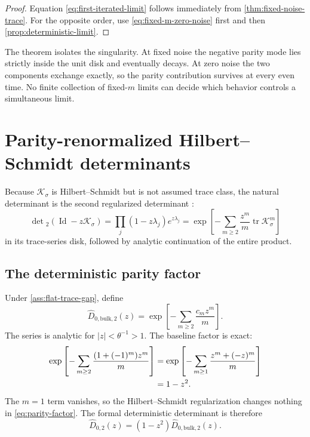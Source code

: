 \documentclass[11pt]{article}
\theoremstyle{definition}
\theoremstyle{remark}
\newcommand{\cK}{\mathcal K}
\newcommand{\Id}{\operatorname{Id}}
\newcommand{\tr}{\operatorname{tr}}
\newcommand{\Det}{\operatorname{det}}
\begin{document}
\begin{proof}
Equation \eqref{eq:first-iterated-limit} follows immediately from
\cref{thm:fixed-noise-trace}.  For the opposite order, use
\eqref{eq:fixed-m-zero-noise} first and then
\cref{prop:deterministic-limit}.
\end{proof}

The theorem isolates the singularity.  At fixed noise the negative parity
mode lies strictly inside the unit disk and eventually decays.  At zero noise
the two components exchange exactly, so the parity contribution survives at
every even time.  No finite collection of fixed-$m$ limits can decide which
behavior controls a simultaneous limit.

\section{Parity-renormalized Hilbert--Schmidt determinants}
\label{sec:determinants}

Because $\cK_\sigma$ is Hilbert--Schmidt but is not assumed trace class, the
natural determinant is the second regularized determinant
\citep{Simon2005}:
\begin{equation}\label{eq:det2}
 \Det{}_2(\Id-z\cK_\sigma)
 =\prod_j(1-z\lambda_j)e^{z\lambda_j}
 =\exp\left[-\sum_{m\ge2}
 \frac{z^m}{m}\tr\cK_\sigma^m\right]
\end{equation}
in its trace-series disk, followed by analytic continuation of the entire
product.

\subsection{The deterministic parity factor}

Under \cref{ass:flat-trace-gap}, define
\begin{equation}\label{eq:deterministic-bulk-determinant}
 \widehat D_{0,\mathrm{bulk},2}(z)
 =\exp\left[-\sum_{m\ge2}\frac{c_mz^m}{m}\right].
\end{equation}
The series is analytic for $|z|<\theta^{-1}>1$.  The baseline factor is exact:
\begin{align}
 \exp\left[-\sum_{m\ge2}
 \frac{(1+(-1)^m)z^m}{m}\right]
 &=\exp\left[-\sum_{m\ge1}
 \frac{z^m+(-z)^m}{m}\right]\notag\\
 &=1-z^2.
 \label{eq:parity-factor}
\end{align}
The $m=1$ term vanishes, so the Hilbert--Schmidt regularization changes
nothing in \eqref{eq:parity-factor}.  The formal deterministic determinant is
therefore
\begin{equation}\label{eq:deterministic-factorization}
 \widehat D_{0,2}(z)
 =(1-z^2)\widehat D_{0,\mathrm{bulk},2}(z).
\end{equation}
\end{document}
